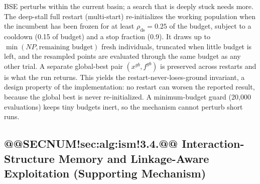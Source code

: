 \documentclass[10pt,a4paper]{article}
\begin{document}
BSE perturbs within the current basin; a search that is deeply stuck
needs more.
The deep-stall full restart (multi-start) re-initializes the working
population when the incumbent has been frozen for at least
$\rho_{\text{ds}}=0.25$ of the budget, subject to a cooldown
(0.15 of budget) and a stop fraction (0.9). It draws up to
$\min(NP, \text{remaining budget})$ fresh individuals, truncated when little
budget is left, and the resampled points are evaluated through the same budget
as any other trial. A separate
global-best pair $(x^{gb},f^{gb})$ is preserved across restarts and is what
the run returns. 
This yields the restart-never-loses-ground invariant, a design
property of the implementation: no restart can worsen the reported
result, because the global best is never re-initialized.
A minimum-budget guard (20{,}000 evaluations) keeps tiny budgets
inert, so the mechanism cannot perturb short
runs. 


\subsection{@@SECNUM!sec:alg:ism!3.4.@@ Interaction-Structure Memory and Linkage-Aware Exploitation (Supporting Mechanism)}\label{sec:alg:ism}
\end{document}

